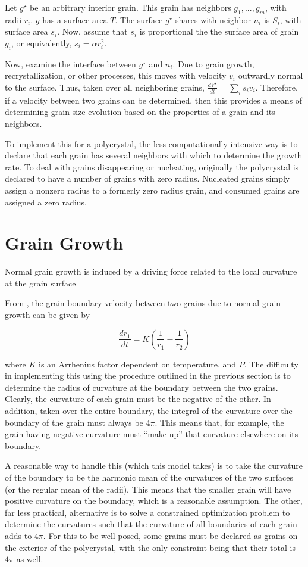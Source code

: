 \documentclass{article}
\begin{document}
Let $g^{\star}$ be an arbitrary interior grain. This grain has neighbors $g_1,...,g_m$, with radii $r_i$. $g$ has a surface area $T$. The surface $g^{\star}$ shares with neighbor $n_i$ is $S_i$, with surface area $s_i$. Now, assume that $s_i$ is proportional the the surface area of grain $g_i$, or equivalently, $s_i=\alpha r_i^2$.

Now, examine the interface between $g^{\star}$ and $n_i$. Due to grain growth, recrystallization, or other processes, this moves with velocity $v_i$ outwardly normal to the surface. Thus, taken over all neighboring grains, $\frac{dV^{\star}}{dt}=\sum_{i}s_i v_i$. Therefore, if a velocity between two grains can be determined, then this provides a means of determining grain size evolution based on the properties of a grain and its neighbors.

To implement this for a polycrystal, the less computationally intensive way is to declare that each grain has several neighbors with which to determine the growth rate. To deal with grains disappearing or nucleating, originally the polycrystal is declared to have a number of grains with zero radius. Nucleated grains simply assign a nonzero radius to a formerly zero radius grain, and consumed grains are assigned a zero radius. 

\section{Grain Growth}
Normal grain growth is induced by a driving force related to the local curvature at the grain surface

From \citet{durand2006}, the grain boundary velocity between two grains due to normal grain growth can be given by

\[\frac{dr_1}{dt} = K \left( \frac{1}{r_1}-\frac{1}{r_2} \right)
\]

where $K$ is an Arrhenius factor dependent on temperature, and $P$. The difficulty in implementing this using the procedure outlined in the previous section is to determine the radius of curvature at the boundary between the two grains. Clearly, the curvature of each grain must be the negative of the other. In addition, taken over the entire boundary, the integral of the curvature over the boundary of the grain must always be $4 \pi$. This means that, for example, the grain having negative curvature must ``make up'' that curvature elsewhere on its boundary. 

A reasonable way to handle this (which this model takes)  is to take the curvature of the boundary to be the harmonic mean of the curvatures of the two surfaces (or the regular mean of the radii). This means that the smaller grain will have positive curvature on the boundary, which is a reasonable assumption. The other, far less practical, alternative is to solve a constrained optimization problem to determine the curvatures such that the curvature of all boundaries of each grain adds to $4 \pi$. For this to be well-posed, some grains must be declared as grains on the exterior of the polycrystal, with the only constraint being that their total is $4 \pi$ as well. 
\end{document}

